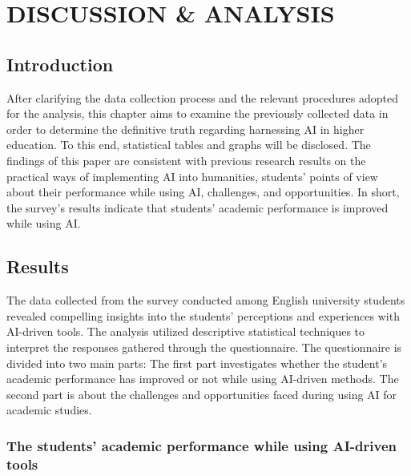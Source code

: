 \chapter{DISCUSSION \& ANALYSIS}
\section{Introduction}
After clarifying the data collection process and the relevant
procedures adopted for the analysis, this chapter aims to
examine the previously collected data in order to
determine the definitive truth regarding harnessing
AI in higher education. To this end, statistical
tables and graphs will be disclosed. The findings
of this paper are consistent with previous research
results on the practical ways of implementing AI
into humanities, students’ points of view about
their performance while using AI, challenges,
and opportunities. In short, the survey’s results
indicate that students’ academic performance is improved while using AI.
\section{Results}
The data collected from the survey conducted among English university
students revealed compelling insights into the students' perceptions
and experiences with AI-driven tools. The analysis utilized descriptive
statistical techniques to interpret the responses gathered through
the questionnaire. The questionnaire is divided into two main parts:
The first part investigates whether the student's academic performance
has improved or not while using AI-driven methods. The second part is
about the challenges and opportunities faced during using AI for academic studies.
\subsection{The students' academic performance while using AI-driven tools}

\begin{figure}[h]
	\centering
\end{figure}

